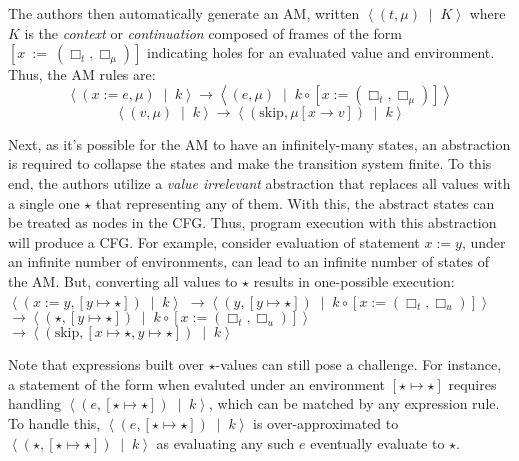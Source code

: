 The authors then automatically generate an AM, written
$\left\langle \left(t, \mu\right) \;\mid\; K\right\rangle$ where $K$ is the
\emph{context} or \emph{continuation} composed of frames of the form $[x\ :=\
(\Box_{t}, \Box_{\mu})]$ indicating holes for an evaluated value and
environment. Thus, the AM rules are:
$$
\left\langle \left( x := e, \mu \right)\;\mid\; k \right\rangle \rightarrow
\left\langle \left( e, \mu \right)\;\mid\; k \circ \left[x := \left(\Box_t,\Box_{\mu}\right) \right]\right\rangle
$$
$$
\left\langle \left( v, \mu \right)\;\mid\; k \right\rangle \rightarrow
\left\langle \left(\text{skip}, \mu\left[x \rightarrow v \right] \right) \;\mid\; k \right\rangle
$$

Next, as it's possible for the AM to have an infinitely-many states, an
abstraction is required to collapse the states and make the transition system
finite. To this end, the authors utilize a \emph{value irrelevant} abstraction
that replaces all values with a single one $\star$ that representing any of
them. With this, the abstract states can be treated as nodes in the CFG.
Thus, program execution with this abstraction will produce a CFG.
For example, consider evaluation of statement $x := y$, under an
infinite number of environments, can lead to an infinite number of
states of the AM.
But, converting all values to $\star$ results in
one-possible execution: $\left\langle \left( x := y, \left[ y \mapsto \star
    \right] \right) \;\mid\; k \right\rangle$
$\rightarrow  \left\langle \left(y, \left[ y \mapsto \star \right] \right) \;\mid\; k \circ \left[ x := \left(\Box_t,\Box_u\right) \right] \right\rangle$
$\rightarrow  \left\langle \left(\star, \left[ y \mapsto \star \right] \right) \;\mid\; k \circ \left[ x := \left(\Box_t,\Box_u\right) \right] \right\rangle$
$\rightarrow  \left\langle \left(\text{skip}, \left[x \mapsto \star, y \mapsto \star \right] \right) \;\mid\; k \right\rangle$

Note that expressions built over $\star$-values can still pose a
challenge. For instance, a statement of the form  when
evaluted under an environment $\left[\star \mapsto \star\right]$ requires
handling $\left\langle \left(e, \left[ \star \mapsto \star \right] \right)\;\mid\; k
\right\rangle$, which can be matched by any expression rule. To handle this,
$\left\langle \left(e, \left[ \star \mapsto \star \right] \right)\;\mid\; k \right\rangle$
is over-approximated to $\left \langle \left(\star, \left[ \star \mapsto \star \right] \right)\;\mid\; k \right\rangle$
as evaluating any such $e$ eventually evaluate to $\star$.


